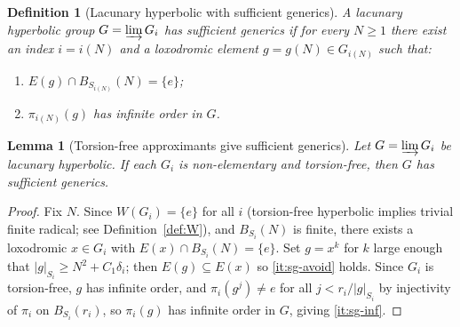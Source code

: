 \documentclass[10pt,a4paper]{amsart}
\newtheorem{definition}{Definition}
\newtheorem{lemma}{Lemma}
\begin{document}
\begin{definition}[Lacunary hyperbolic with sufficient generics]\label{def:suff-generics}
A lacunary hyperbolic group $G = \varinjlim G_i$ \emph{has sufficient generics} if
for every $N \geq 1$ there exist an index $i = i(N)$ and a loxodromic element
$g = g(N) \in G_{i(N)}$ such that:
\begin{enumerate}[label=(\roman*)]
  \item\label{it:sg-avoid} $E(g) \cap B_{S_{i(N)}}(N) = \{e\}$;
  \item\label{it:sg-inf} $\pi_{i(N)}(g)$ has infinite order in $G$.
\end{enumerate}
\end{definition}

\begin{lemma}[Torsion-free approximants give sufficient generics]\label{lem:tf-sg}
Let $G = \varinjlim G_i$ be lacunary hyperbolic. If each $G_i$ is non-elementary
and torsion-free, then $G$ has sufficient generics.
\end{lemma}

\begin{proof}
Fix $N$. Since $W(G_i) = \{e\}$ for all $i$ (torsion-free hyperbolic implies trivial
finite radical; see Definition~\ref{def:W}), and $B_{S_i}(N)$ is finite, there exists a loxodromic
$x \in G_i$ with $E(x) \cap B_{S_i}(N) = \{e\}$.
Set $g = x^k$ for $k$ large enough that $|g|_{S_i} \geq N^2 + C_1\delta_i$;
then $E(g) \subseteq E(x)$ so \ref{it:sg-avoid} holds.
Since $G_i$ is torsion-free, $g$ has infinite order, and
$\pi_i(g^j) \neq e$ for all $j < r_i / |g|_{S_i}$ by injectivity of $\pi_i$ on
$B_{S_i}(r_i)$, so $\pi_i(g)$ has infinite order in $G$, giving \ref{it:sg-inf}.
\end{proof}
\end{document}
